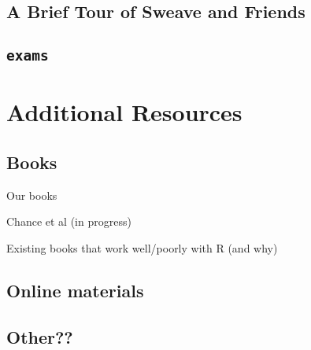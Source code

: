 \section{A Brief Tour of Sweave and Friends}

\section{\texttt{exams}}

\chapter{Additional Resources}

\section{Books}

Our books

Chance et al (in progress)

Existing books that work well/poorly with R (and why)

\section{Online materials}

\section{Other??}
